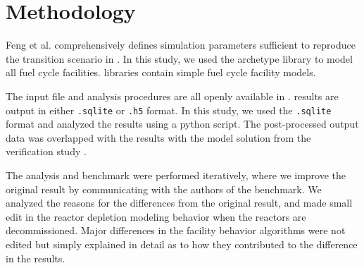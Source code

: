 \section{Methodology}

Feng et al. comprehensively defines simulation parameters
sufficient to reproduce the transition scenario in \Cyclus.
In this study, we used the \Cycamore \cite{huff_fundamental_2016}
 archetype library to model
all fuel cycle facilities. \Cycamore libraries contain
simple fuel cycle facility models. 

The \Cyclus input file and analysis procedures are all
openly available in \cite{bae_arfc/transition-scenarios:_2018}.
\Cyclus results are output in either \texttt{.sqlite} or
\texttt{.h5} format. In this study, we used the
\texttt{.sqlite} format and analyzed the results
using a python script. The post-processed
output data was overlapped with the results with the
model solution from the verification study \cite{feng_standardized_2016}.

The analysis and benchmark were performed iteratively,
where we improve the original result by communicating
with the authors of the benchmark. 
We analyzed the reasons for the differences from the original
result, and made small edit in the reactor depletion modeling behavior
when the reactors are decommissioned.
Major differences in the facility behavior algorithms were not edited but
simply explained in detail as to how they contributed
to the difference in the results.
